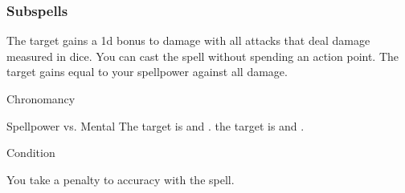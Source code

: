 \subsubsection{Subspells}
The target gains a \plus1d bonus to damage with all attacks that deal damage measured in dice.
You can cast the spell without spending an action point.
The target gains  equal to your spellpower against all damage.
\begin{spellsection}{Chronomancy}
\begin{spellheader}
\end{spellheader}
\begin{spellcontent}
\begin{spelltargetinginfo}
\end{spelltargetinginfo}
\begin{spelleffects}
\begin{spellattack}{Spellpower vs. Mental}
\spellsuccess
The target is  and .
\spellcritical
the target is  and .
\end{spellattack}
\spelldur Condition
\end{spelleffects}
\end{spellcontent}
\begin{spellfooter}
\end{spellfooter}
\begin{spellsubcontent}
\begin{spellcantrip}
You take a  penalty to accuracy with the spell.
\end{spellcantrip}
\end{spellsubcontent}
\end{spellsection}
